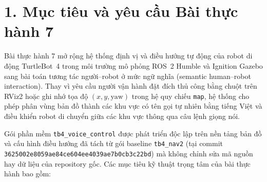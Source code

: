 \section*{1. Mục tiêu và yêu cầu Bài thực hành 7}

Bài thực hành 7 mở rộng hệ thống định vị và điều hướng tự động của robot di động TurtleBot~4 trong môi trường mô phỏng ROS~2 Humble và Ignition Gazebo sang bài toán tương tác người--robot ở mức ngữ nghĩa (semantic human--robot interaction). Thay vì yêu cầu người vận hành đặt đích thủ công bằng chuột trên RViz2 hoặc ghi nhớ tọa độ $(x, y, \text{yaw})$ trong hệ quy chiếu \texttt{map}, hệ thống cho phép phân vùng bản đồ thành các khu vực có tên gọi tự nhiên bằng tiếng Việt và điều khiển robot di chuyển giữa các khu vực thông qua câu lệnh giọng nói.

Gói phần mềm \texttt{tb4\_voice\_control} được phát triển độc lập trên nền tảng bản đồ và cấu hình điều hướng đã tách từ gói baseline \texttt{tb4\_nav2} (tại commit \texttt{3625002e8059ae84ce604ee4039ae7b0cb3c22bd}) mà không chỉnh sửa mã nguồn hay dữ liệu của repository gốc. Các mục tiêu kỹ thuật trọng tâm của bài thực hành bao gồm:

